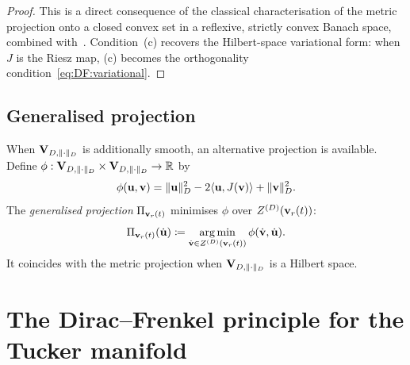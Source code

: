 \begin{proof}
This is a direct consequence of the classical characterisation of the
metric projection onto a closed convex set in a reflexive, strictly
convex Banach space, combined with~\cite[Proposition~2.10]{Alber1996}.
Condition~(c) recovers the Hilbert-space variational form: when $J$
is the Riesz map, (c) becomes the orthogonality condition~\eqref{eq:DF:variational}.
\end{proof}

\subsection*{Generalised projection}

When $\mathbf{V}_{D,\|\cdot\|_D}$ is additionally smooth, an alternative projection is
available. Define $\phi: \mathbf{V}_{D,\|\cdot\|_D} \times \mathbf{V}_{D,\|\cdot\|_D} \to \mathbb{R}$ by
\begin{equation*}
    \phi(\mathbf{u}, \mathbf{v}) = \|\mathbf{u}\|_D^2 - 2\langle \mathbf{u}, J(\mathbf{v}) \rangle + \|\mathbf{v}\|_D^2.
\end{equation*}
The \emph{generalised projection} $\Pi_{\mathbf{v}_r(t)}$ minimises $\phi$
over $Z^{(D)}(\mathbf{v}_r(t))$:
\begin{equation*}
    \Pi_{\mathbf{v}_r(t)}(\dot{\mathbf{u}})
    \coloneqq \operatorname*{arg\,min}_{\dot{\mathbf{v}} \in Z^{(D)}(\mathbf{v}_r(t))}
    \phi(\dot{\mathbf{v}}, \dot{\mathbf{u}}).
\end{equation*}
It coincides with the metric projection when $\mathbf{V}_{D,\|\cdot\|_D}$ is a Hilbert
space.

\section{The Dirac--Frenkel principle for the Tucker manifold}
\label{sec:DF:tucker}

